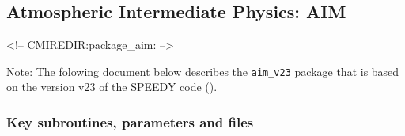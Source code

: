 \subsection{Atmospheric Intermediate Physics: AIM}
\label{sec:pkg:aim}
\begin{rawhtml}
<!-- CMIREDIR:package_aim: -->
\end{rawhtml}

Note:
 The folowing document below describes the \texttt{aim\_v23} package
 that is based on the version v23 of the SPEEDY code (\cite{molteni:03}).

\subsubsection{Key subroutines, parameters and files}
\label{sec:pkg:aim:implementation}
